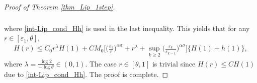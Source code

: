 \documentclass[reqno,12pt]{amsart} %
\theoremstyle{definition}
\theoremstyle{remark}
\numberwithin{equation}{section}
\begin{document}
\begin{proof}[Proof of Theorem \ref{thm_Lip_1step}]
\begin{align*}
\begin{aligned}
        \end{aligned}
    \end{align*}
    where \eqref{int-Lip_cond_Hh} is used in the last inequality. This yields that for any $r\in[\varepsilon_1, \theta]$,
    \begin{align*}
        H(r)\leq C_0 r^\lambda H(1)+CM_0\bigg[\Big(\frac{\varepsilon_1}{r}\Big)^{\alpha \sigma}+r^\lambda+\sup_{k\geq 2}\bigg(\frac{\varepsilon_k}{\varepsilon_{k-1}}\bigg)^{\alpha \sigma}\bigg]\{H(1)+h(1)\},
    \end{align*}
    where $\lambda=\frac{\log 2}{-\log \theta} \in (0,1)$. The case $r\in [\theta, 1]$ is trivial since $H(r)\leq CH(1)$ due to \eqref{int-Lip_cond_Hh}. The proof is complete. 
\end{proof}
\end{document}
